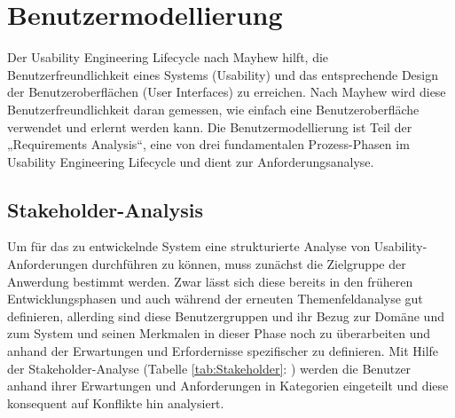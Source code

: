 \section{Benutzermodellierung}
	Der Usability Engineering Lifecycle nach Mayhew hilft, die Benutzerfreundlichkeit eines Systems (Usability) und das entsprechende Design der Benutzeroberflächen (User Interfaces) zu erreichen. Nach Mayhew wird diese Benutzerfreundlichkeit daran gemessen, wie einfach eine Benutzeroberfläche verwendet und erlernt werden kann. Die Benutzermodellierung ist Teil der „Requirements Analysis“, eine von drei fundamentalen Prozess-Phasen im Usability Engineering Lifecycle und dient zur Anforderungsanalyse. \cite{MD}
	\subsection{Stakeholder-Analysis}
	Um für das zu entwickelnde System eine strukturierte Analyse von Usability-Anforderungen durchführen zu können, muss zunächst die Zielgruppe der Anwerdung bestimmt werden. Zwar lässt sich diese bereits in den früheren Entwicklungsphasen und auch während der erneuten Themenfeldanalyse gut definieren, allerding sind diese Benutzergruppen und ihr Bezug zur Domäne und zum System und  seinen Merkmalen in dieser Phase noch zu überarbeiten und anhand  der Erwartungen und Erfordernisse spezifischer zu definieren.  Mit Hilfe der Stakeholder-Analyse (Tabelle  \ref{tab:Stakeholder}: ) werden die Benutzer anhand ihrer Erwartungen und Anforderungen in Kategorien eingeteilt und diese konsequent auf Konflikte hin analysiert.

